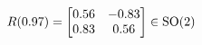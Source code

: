 \documentclass[preview]{standalone}
\begin{document}
\begin{align*}
\special{dvisvgm:raw <g id='unique000'>}R(0.97) = \begin{bmatrix} 0.56 & -0.83 \\ 0.83 & 0.56 \end{bmatrix} \in \text{SO}(2)\special{dvisvgm:raw </g>}
\end{align*}
\end{document}
